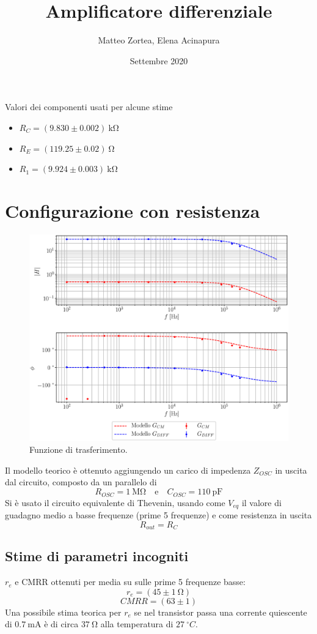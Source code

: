 \documentclass{article}
\title{Amplificatore differenziale}
\date{Settembre 2020}
\author{Matteo Zortea, Elena Acinapura}
\begin{document}
\maketitle

Valori dei componenti usati per alcune stime
\begin{itemize}
    \item ${R_C} = (9.830\pm0.002)~\si{\kilo\ohm}$ 
    \item ${R_E} = (119.25\pm0.02)~\si{\ohm}$
    \item $R_1 = (9.924\pm0.003)~\si{\kilo\ohm}$
\end{itemize}


\section*{Configurazione con resistenza}
\begin{figure}[h!]
    \centering
    \includegraphics[scale = 0.6]{Grafici/resistenza.eps}
    \caption{Funzione di trasferimento.}
    \label{fig:resistenza}
\end{figure}
Il modello teorico è ottenuto aggiungendo un carico di impedenza $Z_{OSC}$ in uscita dal circuito, composto da un parallelo di $$R_{OSC} = 1~\si{\mega\ohm} \quad \text{e} \quad C_{OSC} = 110~\si{\pico\farad}$$
Si è usato il circuito equivalente di Thevenin, usando come $V_{eq}$ il valore di guadagno medio a basse frequenze (prime 5 frequenze) e come resistenza in uscita $$R_{out} = R_C$$

\subsection*{Stime di parametri incogniti}
$r_e$ e CMRR ottenuti per media su sulle prime 5 frequenze basse:
$$ r_e = (45\pm 1~\si{\ohm})$$
$$ CMRR = (63\pm 1)$$
Una possibile stima teorica per $r_e$ se nel transistor passa una corrente quiescente di $0.7~\si{\milli\ampere}$ è di circa $37~\si{\ohm}$ alla temperatura di $27~^{\circ}C$.
\end{document}
